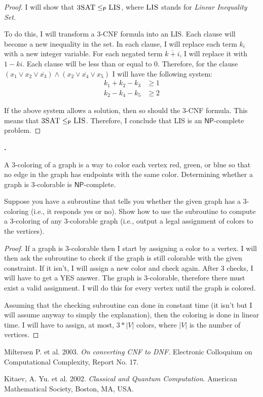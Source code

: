 \documentclass[letterpaper,11pt]{article}
\newcommand{\cc}[1]{\ensuremath{\textsf{#1}}\xspace}
\newcommand{\NP}{\cc{NP}}
\newcommand{\karp}{\le_{\textsf{P}}}
\newcounter{problem}
\newenvironment{problem}%
{%
	\stepcounter{problem}%
	\textbf{\theproblem.}
	\large
}{\\}%
\begin{document}
\begin{proof}
I will show that $\textsc{3SAT} \karp \textsc{LIS}$, where $\textsc{LIS}$ stands for {\it Linear Inequality Set}.

To do this, I will transform a 3-{\sc CNF} formula into an {\sc LIS}.
Each clause will become a new inequality in the set.
In each clause, I will replace each term $k_{i}$ with a new integer variable.
For each negated term $\overline{k+{i}}$, I will replace it with $1-k{i}$.
Each clause will be less than or equal to 0.
Therefore, for the clause $(x_{1} \vee x_{2} \vee \overline{x_{3}}) \wedge (x_{2} \vee \overline{x_{4}} \vee x_{5})$ I will have the following system:
%
\begin{align*}
	k_{1} + k_{2} - k_{3} &\ge 1 \\
	k_{2} - k_{4} - k_{5} &\ge 2 
\end{align*}

If the above system allows a solution, then so should the 3-{\sc CNF} formula.
This means that $\textsc{3SAT} \karp \textsc{LIS}$.
Therefore, I conclude that {\sc LIS} is an $\NP$-complete problem.

\end{proof}

\begin{problem}
A 3-coloring of a graph is a way to color each vertex red, green, or blue so that no edge in the graph has endpoints with the same color. Determining whether a graph is 3-colorable is \NP-complete.

Suppose you have a subroutine that tells you whether the given graph has a 3-coloring (i.e., it responds {\sc yes} or {\sc no}). Show how to use the subroutine to compute a 3-coloring of any 3-colorable graph (i.e., output a legal assignment of colors to the vertices).
\end{problem}

\begin{proof}
If a graph is 3-colorable then I start by assigning a color to a vertex.
I will then ask the subroutine to check if the graph is still colorable with the given constraint.
If it isn't, I will assign a new color and check again.
After 3 checks, I will have to get a {\sc YES} answer.
The graph is 3-colorable, therefore there must exist a valid assignment.
I will do this for every vertex until the graph is colored.

Assuming that the checking subroutine can done in constant time (it isn't but I will assume anyway to simply the explanation), then the coloring is done in linear time.
I will have to assign, at most, $3*|V|$ colors, where $|V|$ is the number of vertices.
\end{proof}

\begin{thebibliography}{1}

 Miltersen P. et al. 2003. {\em On converting CNF to DNF.} Electronic Colloquium on Computational Complexity, Report No. 17.

 Kitaev, A. Yu. et al. 2002. {\em Classical and Quantum Computation}. American Mathematical Society, Boston, MA, USA.


\end{thebibliography}
\end{document}
